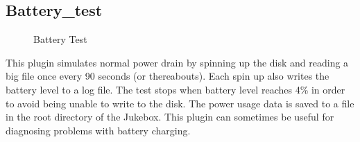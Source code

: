 \subsection{Battery\_test}
\begin{figure}[h]
\begin{center}
\end{center}
\caption{Battery Test}
\end{figure}

This plugin simulates normal power drain by spinning up the disk and
reading a big file once every 90 seconds (or thereabouts). Each
spin up also writes the battery level to a
log file. The test stops when battery level reaches 4\% in order to
avoid being unable to write to the disk.  The power usage data is saved
to a file in the root directory of the Jukebox.  This plugin can
sometimes be useful for diagnosing problems with battery charging.

